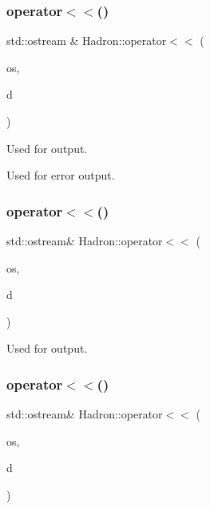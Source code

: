 \subsubsection{\texorpdfstring{operator$<$$<$()}{operator<<()}\hspace{0.1cm}{\footnotesize\ttfamily [15/48]}}
{\footnotesize\ttfamily std\+::ostream \& Hadron\+::operator$<$$<$ (\begin{DoxyParamCaption}\item[{std\+::ostream \&}]{os,  }\item[{const \mbox{\hyperlink{structHadron_1_1KeyHadronNPartNPtCorr__t}{Key\+Hadron\+N\+Part\+N\+Pt\+Corr\+\_\+t}} \&}]{d }\end{DoxyParamCaption})}



Used for output. 

Used for error output. \mbox{\label{namespaceHadron_a72505ccb2507699c4fc69053f96fe6d4}} 
\subsubsection{\texorpdfstring{operator$<$$<$()}{operator<<()}\hspace{0.1cm}{\footnotesize\ttfamily [16/48]}}
{\footnotesize\ttfamily std\+::ostream\& Hadron\+::operator$<$$<$ (\begin{DoxyParamCaption}\item[{std\+::ostream \&}]{os,  }\item[{const \mbox{\hyperlink{structHadron_1_1KeyHadronNPartIrrepOp__t_1_1CGPair__t}{Key\+Hadron\+N\+Part\+Irrep\+Op\+\_\+t\+::\+C\+G\+Pair\+\_\+t}} \&}]{d }\end{DoxyParamCaption})}



Used for output. 

\mbox{\label{namespaceHadron_a20c42b7ec1de1c12cf53c8871dcb5a78}} 
\subsubsection{\texorpdfstring{operator$<$$<$()}{operator<<()}\hspace{0.1cm}{\footnotesize\ttfamily [17/48]}}
{\footnotesize\ttfamily std\+::ostream\& Hadron\+::operator$<$$<$ (\begin{DoxyParamCaption}\item[{std\+::ostream \&}]{os,  }\item[{const \mbox{\hyperlink{structHadron_1_1KeyHadronSUNNPartIrrepOp__t_1_1CGPair__t}{Key\+Hadron\+S\+U\+N\+N\+Part\+Irrep\+Op\+\_\+t\+::\+C\+G\+Pair\+\_\+t}} \&}]{d }\end{DoxyParamCaption})}




